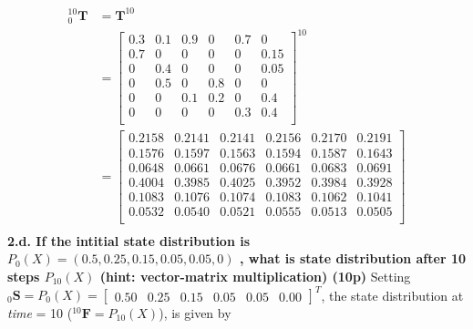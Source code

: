 \documentclass[a4paper,10pt]{article}
\newcommand{\matst}[1]{\ensuremath{{_{#1}}{\mathbf{S}}}}
\newcommand{\matfin}[1]{\ensuremath{{^{#1}}{\mathbf{F}}}}
\newcommand{\mattrans}[2]{{\ensuremath{{_{#1}^{#2}}{\mathbf{T}}}}}
\begin{document}
\begin{equation*}
\begin{split}
\mattrans{0}{10} &= \mathbf{T}^{10}\\
&= {\left[\begin{array}{cccccc}
0.3 & 0.1 & 0.9 & 0 & 0.7 & 0 \\
0.7 & 0 & 0 & 0 & 0 & 0.15 \\
0 & 0.4 & 0 & 0 & 0 & 0.05 \\
0 & 0.5 & 0 & 0.8 & 0 & 0 \\
0 & 0 & 0.1 & 0.2 & 0 & 0.4 \\
0 & 0 & 0 & 0 & 0.3 & 0.4 \\
\end{array}\right]}^{10}\\
&= \boxed{\left[\begin{array}{cccccc}
0.2158 & 0.2141 & 0.2141 & 0.2156 & 0.2170 & 0.2191\\
0.1576 & 0.1597 & 0.1563 & 0.1594 & 0.1587 & 0.1643\\
0.0648 & 0.0661 & 0.0676 & 0.0661 & 0.0683 & 0.0691\\
0.4004 & 0.3985 & 0.4025 & 0.3952 & 0.3984 & 0.3928\\
0.1083 & 0.1076 & 0.1074 & 0.1083 & 0.1062 & 0.1041\\
0.0532 & 0.0540 & 0.0521 & 0.0555 & 0.0513 & 0.0505\\
\end{array}\right]}\\
\end{split} 
\end{equation*}
\newline\noindent\newline\noindent
\newpage\noindent
\textbf{2.d. If the intitial state distribution is $P_{0}(X) =(0.5 , 0.25 , 0.15 , 0.05 , 0.05 , 0)$ , what is state distribution after 10 steps $P_{10}(X)$  (hint: vector-matrix multiplication) (10p)}
\newline\noindent\newline\noindent
Setting $\matst{0}=P_{0}(X)=\left[\begin{array}{cccccc} 0.50 & 0.25 & 0.15 & 0.05 & 0.05 & 0.00\end{array}\right]^{T}$, the state distribution at \emph{time} = 10
($\matfin{10}=P_{10}(X)$), is given by
\end{document}

